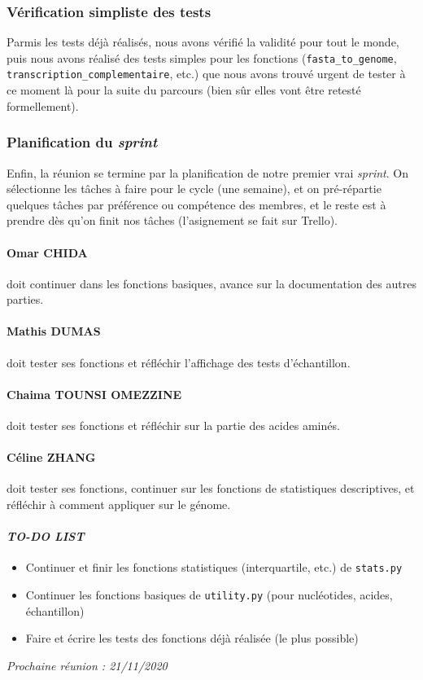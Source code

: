 \subsubsection*{Vérification simpliste des tests}
Parmis les tests déjà réalisés, nous avons vérifié la validité pour tout le monde, puis nous avons réalisé des tests simples pour les fonctions (\texttt{fasta\_to\_genome}, \texttt{transcription\_complementaire}, etc.) que nous avons trouvé urgent de tester à ce moment là pour la suite du parcours (bien sûr elles vont être retesté formellement).

\subsubsection*{Planification du \textsl{sprint}}
Enfin, la réunion se termine par la planification de notre premier vrai \textsl{sprint}. On sélectionne les tâches à faire pour le cycle (une semaine), et on pré-répartie quelques tâches par préférence ou compétence des membres, et le reste est à prendre dès qu'on finit nos tâches (l'asignement se fait sur Trello).
\paragraph*{Omar CHIDA} doit continuer dans les fonctions basiques, avance sur la documentation des autres parties.

\paragraph*{Mathis DUMAS} doit tester ses fonctions et réfléchir l'affichage des tests d'échantillon.

\paragraph*{Chaima TOUNSI OMEZZINE} doit tester ses fonctions et réfléchir sur la partie des acides aminés.

\paragraph*{Céline ZHANG} doit tester ses fonctions, continuer sur les fonctions de statistiques descriptives, et réfléchir à comment appliquer sur le génome.

\paragraph{\emph{TO-DO LIST}}
\begin{itemize}
    \item Continuer et finir les fonctions statistiques (interquartile, etc.) de \texttt{stats.py}
    \item Continuer les fonctions basiques de \texttt{utility.py} (pour nucléotides, acides, échantillon)
    \item Faire et écrire les tests des fonctions déjà réalisée (le plus possible)
\end{itemize}

\emph{Prochaine réunion : 21/11/2020}\\

% 